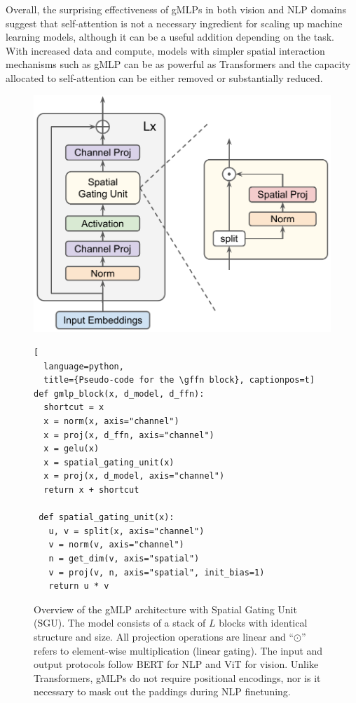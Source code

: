 \documentclass{article}
\newcommand{\gffn}{gMLP\xspace}
\begin{document}
Overall,
the surprising effectiveness of \gffn{s} in both vision and NLP domains suggest that self-attention is not a necessary ingredient for scaling up machine learning models,
although it can be a useful addition depending on the task.
With increased data and compute,
models with simpler spatial interaction mechanisms such as gMLP can be as powerful as Transformers and
the capacity allocated to self-attention can be either removed or substantially reduced.

\begin{figure}[t]
    \centering
    \begin{minipage}{0.5\linewidth}
        \includegraphics[width=0.95\linewidth]{figures/gmlp-overview.pdf}
    \end{minipage}
    \begin{minipage}{0.475\linewidth}
    \begin{lstlisting}[
  language=python,
  title={Pseudo-code for the \gffn block}, captionpos=t]
def gmlp_block(x, d_model, d_ffn):
  shortcut = x
  x = norm(x, axis="channel")
  x = proj(x, d_ffn, axis="channel")
  x = gelu(x)
  x = spatial_gating_unit(x)
  x = proj(x, d_model, axis="channel")
  return x + shortcut
  
 def spatial_gating_unit(x):
   u, v = split(x, axis="channel")
   v = norm(v, axis="channel")
   n = get_dim(v, axis="spatial")
   v = proj(v, n, axis="spatial", init_bias=1)
   return u * v
\end{lstlisting}
    \end{minipage}
    \caption{Overview of the \gffn architecture with Spatial Gating Unit (SGU). The model consists of a stack of $L$ blocks with identical structure and size. All projection operations are linear and ``$\odot$'' refers to element-wise multiplication (linear gating). The input and output protocols follow BERT for NLP and ViT for vision. Unlike Transformers, \gffn{s} do not require positional encodings, nor is it necessary to mask out the paddings during NLP finetuning.}
    \label{fig:architecture}
\end{figure}
\end{document}
